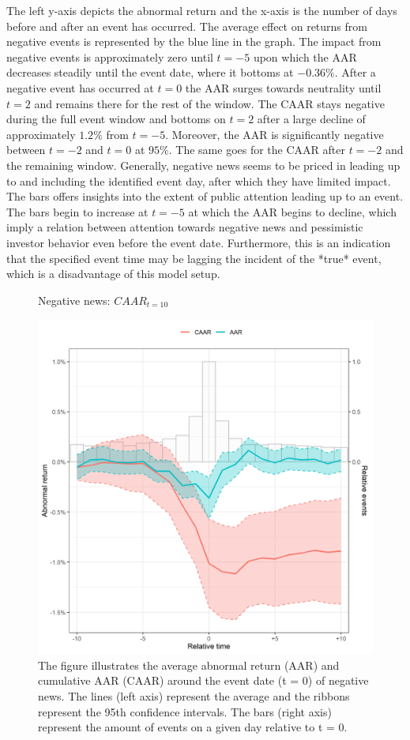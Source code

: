 The left y-axis depicts the abnormal return and the x-axis is the number of days before and after an event has occurred. The average effect on returns from negative events is represented by the blue line in the graph. 
The impact from negative events is approximately zero until $t = -5$ upon which the AAR decreases steadily until the event date, where it bottoms at $-0.36\%$. After a negative event has occurred at $t=0$ the AAR surges towards neutrality until $t=2$ and remains there for the rest of the window. The CAAR stays negative during the full event window and bottoms on $t=2$ after a large decline of approximately $1.2\%$ from $t=-5$. Moreover, the AAR is significantly negative between $t=-2$ and $t=0$ at $95\%$. The same goes for the CAAR after $t=-2$ and the remaining window. Generally, negative news seems to be priced in leading up to and including the identified event day, after which they have limited impact. \\ 
The bars offers insights into the extent of public attention leading up to an event. The bars begin to increase at $t=-5$ at which the AAR begins to decline, which imply a relation between attention towards negative news and pessimistic investor behavior even before the event date. Furthermore, this is an indication that the specified event time may be lagging the incident of the *true* event, which is a disadvantage of this model setup.  

\begin{figure} [H]
    \centering
    \caption{Negative news: $CAAR_{t=10}$}
    \includegraphics[scale=0.6]{Projekt/1.Figures analysis/ST_negative_all_CI.png}
     \caption*{\footnotesize The figure illustrates the average abnormal return (AAR) and cumulative AAR (CAAR) around the event date (t = 0) of negative news. The lines (left axis) represent the average and the ribbons represent the 95th confidence intervals. The bars (right axis) represent the amount of events on a given day relative to t = 0. }
    \label{fig:ST_neg_news}
\end{figure} 

